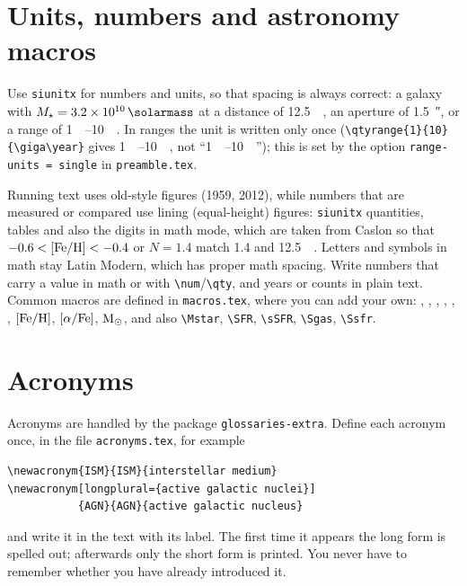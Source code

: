 \section{Units, numbers and astronomy macros}\label{sec:units}

Use \texttt{siunitx} for numbers and units, so that spacing is always correct: a galaxy with $\Mstar=\qty{3.2e10}{\solarmass}$ at a distance of \qty{12.5}{\mega\parsec}, an aperture of \SI{1.5}{\arcsecond}, or a range of \qtyrange{1}{10}{\giga\year}. In ranges the unit is written only once (\verb|\qtyrange{1}{10}{\giga\year}| gives \qtyrange{1}{10}{\giga\year}, not ``\qty{1}{\giga\year}--\qty{10}{\giga\year}''); this is set by the option \texttt{range-units = single} in \texttt{preamble.tex}.

Running text uses old-style figures (1959, 2012), while numbers that are measured or compared use lining (equal-height) figures: \texttt{siunitx} quantities, tables and also the digits in math mode, which are taken from Caslon so that $-0.6<[\mathrm{Fe}/\mathrm{H}]<-0.4$ or $N=1.4$ match \num{1.4} and \qty{12.5}{\mega\parsec}. Letters and symbols in math stay Latin Modern, which has proper math spacing. Write numbers that carry a value in math or with \verb|\num|/\verb|\qty|, and years or counts in plain text. Common macros are defined in \texttt{macros.tex}, where you can add your own: \Halpha, \Hbeta, \nii, \oiii, \hi, \hii, $[\mathrm{Fe}/\mathrm{H}]$, $[\alpha/\mathrm{Fe}]$, $\mathrm{M}_{\odot}$, and also \verb|\Mstar|, \verb|\SFR|, \verb|\sSFR|, \verb|\Sgas|, \verb|\Ssfr|.

\section{Acronyms}\label{sec:acronyms}

Acronyms are handled by the package \texttt{glossaries-extra}. Define each acronym once, in the file \texttt{acronyms.tex}, for example
\begin{verbatim}
\newacronym{ISM}{ISM}{interstellar medium}
\newacronym[longplural={active galactic nuclei}]
           {AGN}{AGN}{active galactic nucleus}
\end{verbatim}
and write it in the text with its label. The first time it appears the long form is spelled out; afterwards only the short form is printed. You never have to remember whether you have already introduced it.

